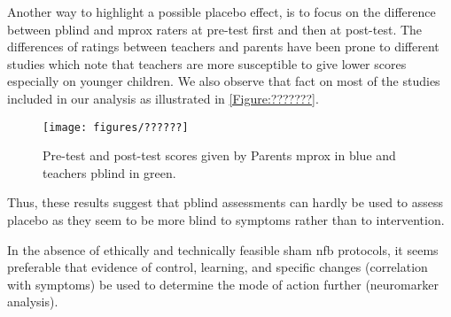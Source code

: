 Another way to highlight a possible placebo effect, is to focus on the difference between \gls{pblind} and \gls{mprox} raters at pre-test 
first and then at post-test. The differences of ratings between teachers and parents have been prone to different studies \citep{Sollie2013, Narad2015}
which note that teachers are more susceptible to give lower scores especially on younger children. We also observe that fact on most of the studies included 
in our analysis as illustrated in \cref{Figure:???????}.  

\begin{figure}[h!]
  \centering
  \texttt{[image: figures/??????]}
  \caption{Pre-test and post-test scores given by Parents \gls{mprox} in blue and teachers \gls{pblind} in green.}
  \label{Figure:??????}
\end{figure} 

Thus, these results suggest that \gls{pblind} assessments can hardly be used to assess placebo as they seem to be more blind
to symptoms rather than to intervention.

In the absence of ethically and technically feasible sham \gls{nfb} protocols, it seems preferable that evidence of control, learning, and specific
changes (correlation with symptoms) be used to determine the mode of action further (neuromarker analysis).      



